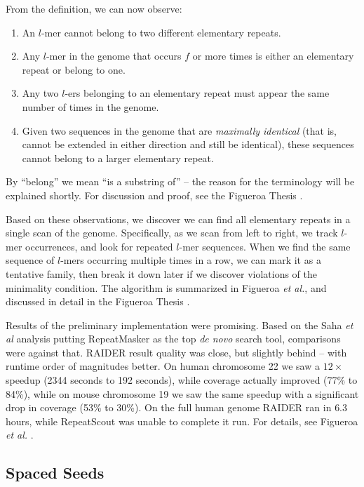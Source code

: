 \documentclass{bmcart}
\begin{document}
\begin{observation}
  \label{RAIDERobs}
  From the definition, we can now observe:
\begin{enumerate}
\item An $l$-mer cannot belong to two different elementary repeats.
\item Any $l$-mer in the genome that occurs $f$ or more times is
  either an elementary repeat or belong to one.
\item Any two $l$-ers belonging to an elementary repeat must appear
  the same number of times in the genome. 
\item Given two sequences in the genome that are {\it maximally
  identical} (that is, cannot be extended in either direction and still
  be identical), these sequences cannot belong to a larger
  elementary repeat.
\end{enumerate}
\end{observation}
By ``belong'' we mean ``is a substring of'' -- the reason for the
terminology will be explained shortly.  For discussion and proof, see
the Figueroa Thesis \cite{Figueroa:2013cz}. 

Based on these observations, we discover we can find all elementary
repeats in a single scan of the genome.  Specifically, as we scan from
left to right, we track $l$-mer occurrences, and look for repeated
$l$-mer sequences.  When we find the same sequence of $l$-mers
occurring multiple times in a row, we can mark it as a tentative family,
then break it down later if we discover violations of the minimality
condition.  The algorithm is summarized in Figueroa {\it et al.}, and
discussed in detail in the Figueroa Thesis \cite{Figueroa:2014uk,Figueroa:2013cz}.

Results of the preliminary implementation were promising.  Based on
the Saha {\it et al} analysis putting RepeatMasker as the top {\it de
  novo} search tool, comparisons were against that.  RAIDER result
quality was close, but slightly behind -- with runtime
order of magnitudes better.  On human chromosome 22 we saw a
$12\times$ speedup (2344 seconds to 192 seconds), while coverage
actually improved (77\% to 84\%), while on mouse chromosome 19 we saw 
the same speedup with a significant drop in coverage (53\% to 30\%).  On
the full human genome RAIDER ran in $6.3$ hours, while RepeatScout was
unable to complete it run.  For details, see Figueroa {\it et al.} \cite{Figueroa:2014uk}.

\subsection*{Spaced Seeds}
 
\end{document}
